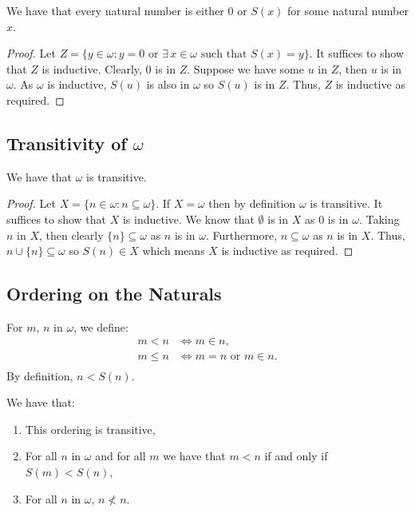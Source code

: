 We have that every natural number is either $0$ or $S(x)$ for some
natural number $x$.

\begin{proof}
    Let $Z = \{y \in \omega : y = 0 \text{ or } 
    \exists \, x \in \omega \text{ such that } S(x) = y\}$. It 
    suffices to show that $Z$ is inductive. Clearly, $0$ is in $Z$.
    Suppose we have some $u$ in $Z$, then $u$ is in $\omega$.
    As $\omega$ is inductive, $S(u)$ is also in $\omega$ so
    $S(u)$ is in $Z$. Thus, $Z$ is inductive as required.
\end{proof}

\subsection{Transitivity of $\omega$}

We have that $\omega$ is transitive.

\begin{proof}
    Let $X = \{n \in \omega : n \subseteq \omega\}$. If $X = \omega$
    then by definition $\omega$ is transitive. It suffices to show that
    $X$ is inductive. We know that $\emptyset$ is in $X$ as $0$ is in
    $\omega$. Taking $n$ in $X$, then clearly $\{n\} \subseteq \omega$
    as $n$ is in $\omega$. Furthermore, $n \subseteq \omega$ as $n$
    is in $X$. Thus, $n \cup \{n\} \subseteq \omega$ so $S(n) \in X$
    which means $X$ is inductive as required.
\end{proof}

\subsection{Ordering on the Naturals}

For $m$, $n$ in $\omega$, we define: \begin{align*}
    m < n &\Longleftrightarrow m \in n, \\
    m \leq n &\Longleftrightarrow m = n \text{ or } m \in n. \\
\end{align*} By definition, $n < S(n)$.

\newpage
\noindent
We have that: \begin{enumerate}
    \item This ordering is transitive,
    \item For all $n$ in $\omega$ and for all $m$ we have that
        $m < n$ if and only if $S(m) < S(n)$,
    \item For all $n$ in $\omega$, $n \nless n$.
\end{enumerate}

